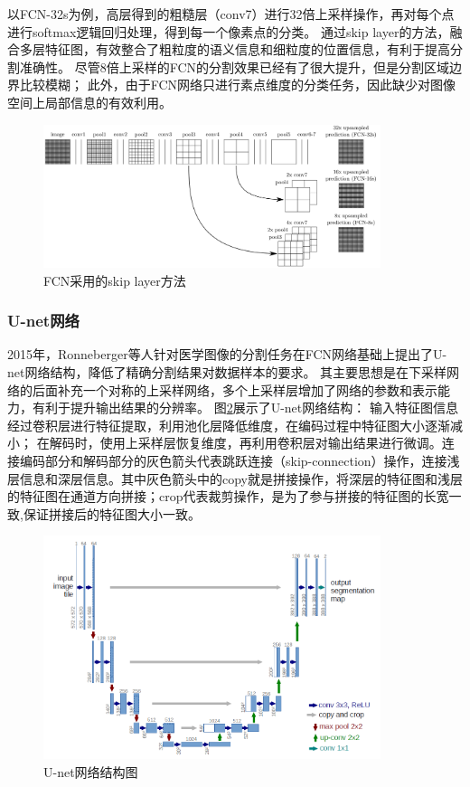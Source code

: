 以FCN-32s为例，高层得到的粗糙层（conv7）进行32倍上采样操作，再对每个点进行softmax逻辑回归处理，得到每一个像素点的分类。
通过skip layer的方法，融合多层特征图，有效整合了粗粒度的语义信息和细粒度的位置信息，有利于提高分割准确性。
尽管8倍上采样的FCN的分割效果已经有了很大提升，但是分割区域边界比较模糊；
此外，由于FCN网络只进行素点维度的分类任务，因此缺少对图像空间上局部信息的有效利用。

\begin{figure}[htp]
	\centering
	\includegraphics[width=0.88\textwidth]{figures/FCN_skip.png}
	\caption{FCN采用的skip layer方法}
	\label{fig:FCN_skip}
\end{figure}

\subsubsection{U-net网络}
2015年，Ronneberger等人\cite{DBLP:conf/miccai/RonnebergerFB15}针对医学图像的分割任务在FCN网络基础上提出了U-net网络结构，降低了精确分割结果对数据样本的要求。
其主要思想是在下采样网络的后面补充一个对称的上采样网络，多个上采样层增加了网络的参数和表示能力，有利于提升输出结果的分辨率。
图\ref{fig:unet}展示了U-net网络结构：
输入特征图信息经过卷积层进行特征提取，利用池化层降低维度，在编码过程中特征图大小逐渐减小；
在解码时，使用上采样层恢复维度，再利用卷积层对输出结果进行微调。连接编码部分和解码部分的灰色箭头代表跳跃连接（skip-connection）操作，连接浅层信息和深层信息。其中灰色箭头中的copy就是拼接操作，将深层的特征图和浅层的特征图在通道方向拼接；crop代表裁剪操作，是为了参与拼接的特征图的长宽一致,保证拼接后的特征图大小一致。


\begin{figure}[htp]
	\centering
	\includegraphics[width=0.88\textwidth]{figures/unet.png}
	\caption{U-net网络结构图\cite{DBLP:conf/miccai/RonnebergerFB15}}
	\label{fig:unet}
\end{figure}

